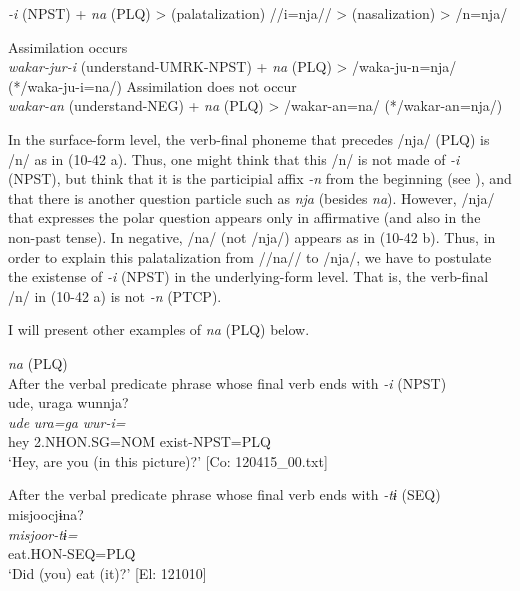 \begin{exe}
\ex\label{ex:10.41}
\textit{{}-i} (NPST)  +  \textit{na}  (PLQ)  >  (palatalization)  //i=nja//  >  (nasalization)  >  /n=nja/

\ex\label{ex:10.42}
\begin{xlist}
\ex Assimilation occurs\\
  \textit{wakar-jur-i}  (understand-UMRK{}-NPST)  +  \textit{na}  (PLQ)  >  /waka-ju-n=nja/  (*/waka-ju-i=na/)
\ex Assimilation does not occur\\
  \textit{wakar-an}  (understand-NEG)  +  \textit{na}  (PLQ)  >  /wakar-an=na/  (*/wakar-an=nja/)
\end{xlist}
\end{exe}

In the surface-form level, the verb-final phoneme that precedes /nja/ (PLQ) is /n/ as in (10-42 a). Thus, one might think that this /n/ is not made of \textit{{}-i} (NPST), but think that it is the participial affix \textit{{}-n} from the beginning (see ), and that there is another question particle such as \textit{nja} (besides \textit{na}). However, /nja/ that expresses the polar question appears only in affirmative (and also in the non-past tense). In negative, /na/ (not /nja/) appears as in (10-42 b). Thus, in order to explain this palatalization from //na// to /nja/, we have to postulate the existense of \textit{-i} (NPST) in the underlying-form level. That is, the verb-final /n/ in (10-42 a) is not \textit{{}-n} (PTCP).

  I will present other examples of \textit{na} (PLQ) below.

\ea\label{ex:10.43}   \textit{na} (PLQ)\\
  \ea After the verbal predicate phrase whose final verb ends with \textit{{}-i} (NPST)\\
      \glll    ude,  uraga  wunnja?\\
    \textit{ude}  \textit{ura=ga}  \textit{wur-i=}\\
    hey  2.NHON.SG=NOM  exist-NPST=PLQ\\
\glt     ‘Hey, are you (in this picture)?’  [Co: 120415\_00.txt]

  \ex After the verbal predicate phrase whose final verb ends with \textit{{}-tɨ} (SEQ)\\
      \glll    misjoocjɨna?\\
    \textit{misjoor-tɨ=}\\
    eat.HON-SEQ=PLQ\\
    \glt     ‘Did (you) eat (it)?’ [El: 121010]

